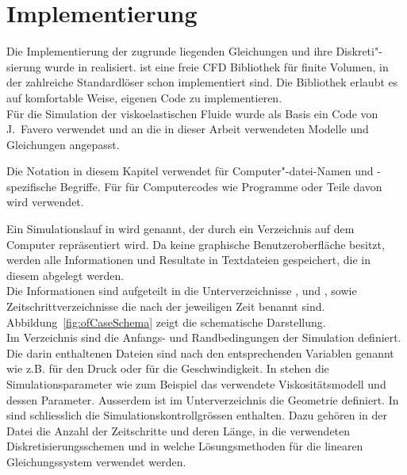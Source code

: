 \section{Implementierung}
\label{Kapitel:Implementierung}
Die Implementierung der zugrunde liegenden Gleichungen und ihre Diskreti"-sierung wurde in \openfoam{} \cite{openfoam} realisiert.
\openfoam{} ist eine freie CFD Bibliothek für finite Volumen, in der zahlreiche Standardlöser schon implementiert sind. Die Bibliothek erlaubt es auf komfortable Weise, eigenen Code zu implementieren.\\
Für die Simulation der viskoelastischen Fluide wurde als Basis ein Code von J.~Favero \cite{faveroOF} verwendet und an die in dieser Arbeit verwendeten Modelle und Gleichungen angepasst.

Die Notation in diesem Kapitel verwendet  für Computer"-datei-Namen und \openfoam{}-spezifische Begriffe. Für für Computercodes wie Programme oder Teile davon wird  verwendet.

Ein Simulationslauf in \openfoam{} wird  genannt, der durch ein Verzeichnis auf dem Computer repräsentiert wird. Da \openfoam{} keine gra\-phi\-sche Benutzeroberfläche besitzt, werden alle Informationen und Resultate in Textdateien gespeichert, die in diesem  abgelegt werden.\\
Die Informationen sind aufgeteilt in die Unterverzeichnisse ,  und , sowie Zeitschrittverzeichnisse die nach der jeweiligen Zeit benannt sind. Abbildung~\ref{fig:ofCaseSchema} zeigt die schematische Darstellung.\\ %
Im Verzeichnis  sind die Anfangs- und Randbedingungen der Simulation definiert. Die darin enthaltenen Dateien sind nach den entsprechenden Variablen genannt wie z.B.  für den Druck oder  für die Geschwindigkeit.
In  stehen die Simulationsparameter wie zum Beispiel das verwendete Viskositätsmodell und dessen Parameter. Ausserdem ist im Unterverzeichnis  die Geometrie definiert.
In  sind schliesslich die Simulationskontrollgrössen enthalten. Dazu gehören in der Datei  die Anzahl der Zeitschritte und deren Länge, in  die verwendeten Diskretisierungsschemen und in  welche Lösungsmethoden für die linearen Gleichungssystem verwendet werden.


